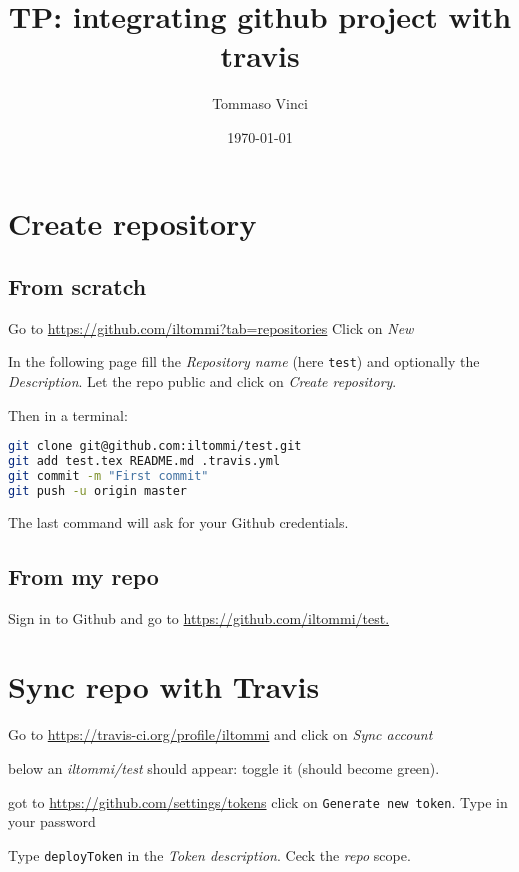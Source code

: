 \documentclass[12pt]{article}
\begin{document}
\title{TP: integrating github project with travis}
\author{Tommaso Vinci}
\date{\today}
\maketitle


\section*{Create repository}

\subsection*{From scratch}

Go to \url{https://github.com/iltommi?tab=repositories} Click on \emph{New}

In the following page fill the \emph{Repository name} (here \texttt{test}) and optionally the \emph{Description}. Let the repo public and click on \emph{Create repository}.

Then in a terminal:

\begin{lstlisting}[language=Bash] 
git clone git@github.com:iltommi/test.git
git add test.tex README.md .travis.yml
git commit -m "First commit"
git push -u origin master
\end{lstlisting}

The last command will ask for your Github credentials.

\subsection*{From my repo}
Sign in to Github and go to \url{https://github.com/iltommi/test.}




\section*{Sync repo with Travis}

Go to \url{https://travis-ci.org/profile/iltommi} and click on \emph{Sync account}

below an \emph{iltommi/test} should appear: toggle it (should become green).

got to \url{https://github.com/settings/tokens} click on \texttt{Generate new token}. Type in your password

Type \texttt{deployToken} in the \emph{Token description}. Ceck the \emph{repo} scope.
\end{document}
